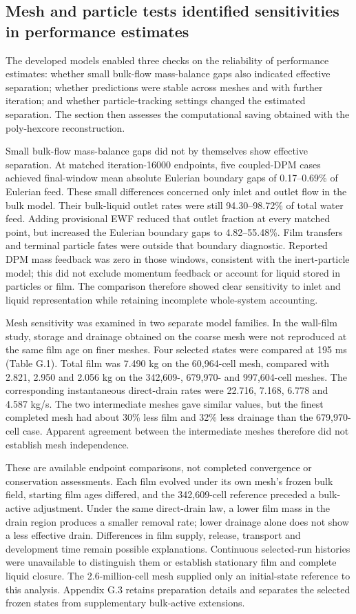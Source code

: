 \subsection{Mesh and particle tests identified sensitivities in performance estimates}

The developed models enabled three checks on the reliability of performance estimates: whether small bulk-flow mass-balance gaps also indicated effective separation; whether predictions were stable across meshes and with further iteration; and whether particle-tracking settings changed the estimated separation. The section then assesses the computational saving obtained with the poly-hexcore reconstruction.

Small bulk-flow mass-balance gaps did not by themselves show effective separation. At matched iteration-16000 endpoints, five coupled-DPM cases achieved final-window mean absolute Eulerian boundary gaps of 0.17--0.69\% of Eulerian feed. These small differences concerned only inlet and outlet flow in the bulk model. Their bulk-liquid outlet rates were still 94.30--98.72\% of total water feed. Adding provisional EWF reduced that outlet fraction at every matched point, but increased the Eulerian boundary gaps to 4.82--55.48\%. Film transfers and terminal particle fates were outside that boundary diagnostic. Reported DPM mass feedback was zero in those windows, consistent with the inert-particle model; this did not exclude momentum feedback or account for liquid stored in particles or film. The comparison therefore showed clear sensitivity to inlet and liquid representation while retaining incomplete whole-system accounting.

Mesh sensitivity was examined in two separate model families. In the wall-film study, storage and drainage obtained on the coarse mesh were not reproduced at the same film age on finer meshes. Four selected states were compared at 195 ms (Table G.1). Total film was 7.490 kg on the 60,964-cell mesh, compared with 2.821, 2.950 and 2.056 kg on the 342,609-, 679,970- and 997,604-cell meshes. The corresponding instantaneous direct-drain rates were 22.716, 7.168, 6.778 and 4.587 kg/s. The two intermediate meshes gave similar values, but the finest completed mesh had about 30\% less film and 32\% less drainage than the 679,970-cell case. Apparent agreement between the intermediate meshes therefore did not establish mesh independence.

These are available endpoint comparisons, not completed convergence or conservation assessments. Each film evolved under its own mesh's frozen bulk field, starting film ages differed, and the 342,609-cell reference preceded a bulk-active adjustment. Under the same direct-drain law, a lower film mass in the drain region produces a smaller removal rate; lower drainage alone does not show a less effective drain. Differences in film supply, release, transport and development time remain possible explanations. Continuous selected-run histories were unavailable to distinguish them or establish stationary film and complete liquid closure. The 2.6-million-cell mesh supplied only an initial-state reference to this analysis. Appendix G.3 retains preparation details and separates the selected frozen states from supplementary bulk-active extensions.

